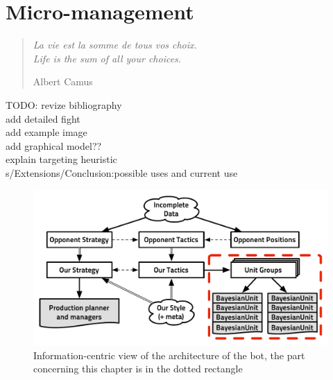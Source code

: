 \chapter{Micro-management}
\chaptertoc
\begin{quotation}
\noindent
\textit{La vie est la somme de tous vos choix.
\vspace{0.2cm}\\
Life is the sum of all your choices.}
\begin{flushright}Albert Camus\end{flushright}
\end{quotation}

TODO: 
revize bibliography\\
add detailed fight\\
add example image\\
add graphical model??\\
explain targeting heuristic\\
s/Extensions/Conclusion:possible uses and current use\\


\begin{figure}[!ht]
\begin{center}
\includegraphics[width=13cm]{images/starcraft_bbq_concept_MICRO.pdf}
\end{center}
\label{fig:conceptMICRO}
\caption{Information-centric view of the architecture of the bot, the part concerning this chapter is in the dotted rectangle}
\end{figure}

